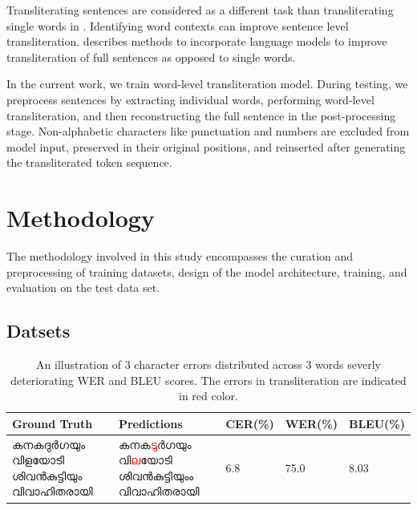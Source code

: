 \documentclass[11pt]{article}
\begin{document}
Transliterating sentences are considered as a different task than transliterating single words in \cite{roark-etal-2020-processing}. Identifying word contexts can improve sentence level transliteration. \citeauthor{kirov2024context} describes methods to incorporate language models to improve transliteration of full sentences as opposed to single words. 

In the current work, we train word-level transliteration model. During testing, we preprocess sentences by extracting individual words, performing word-level transliteration, and then reconstructing the full sentence in the post-processing stage. Non-alphabetic characters like punctuation and numbers are excluded from model input, preserved in their original positions, and reinserted after generating the transliterated token sequence.

\vspace{-.2cm}
\section{Methodology}

The methodology involved in this study encompasses the curation and preprocessing of training datasets, design of the model architecture, training, and evaluation on the test data set.
\vspace{-.2cm}
\subsection{Datsets}

\begin{table}[htbp]
  \caption{An illustration of 3 character errors distributed across 3 words severly deteriorating WER and BLEU scores. The errors in transliteration are indicated in red color.}
  \label{tab:test1}
  \centering
   \begin{tabular}{p{4cm}p{4.3cm}p{1.7cm}p{1.7cm}p{1.7cm}}

    \hline
    \textbf{Ground Truth} & \textbf{Predictions} & \textbf{CER(\%)} & \textbf{WER(\%)} &\textbf{BLEU(\%)}\\
    \hline
    {\footnotesize{\malayalamfont കനകദുർഗയും വിളയോടി ശിവൻകുട്ടിയും വിവാഹിതരായി}}
     & {\footnotesize{\malayalamfont കനക\textcolor{red}{ടു}ർഗയും വി\textcolor{red}{ല}യോടി ശിവൻകുട്ടിയും\textcolor{red}{ം} വിവാഹിതരായി}} & 6.8 & 75.0 & 8.03 \\ 
    \hline
  \end{tabular}

\end{table}
\end{document}
